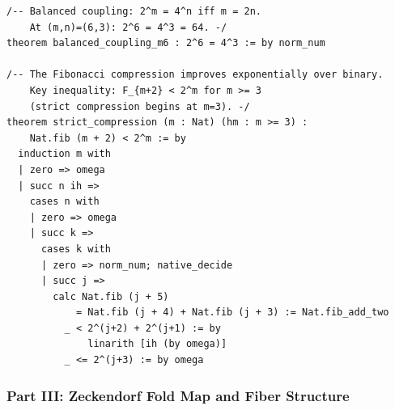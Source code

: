 \begin{lstlisting}[language=Lean4,caption={Resolution chain verification at $(m{,}n)=(6{,}3)$}]
/-- Balanced coupling: 2^m = 4^n iff m = 2n.
    At (m,n)=(6,3): 2^6 = 4^3 = 64. -/
theorem balanced_coupling_m6 : 2^6 = 4^3 := by norm_num

/-- The Fibonacci compression improves exponentially over binary.
    Key inequality: F_{m+2} < 2^m for m >= 3
    (strict compression begins at m=3). -/
theorem strict_compression (m : Nat) (hm : m >= 3) :
    Nat.fib (m + 2) < 2^m := by
  induction m with
  | zero => omega
  | succ n ih =>
    cases n with
    | zero => omega
    | succ k =>
      cases k with
      | zero => norm_num; native_decide
      | succ j =>
        calc Nat.fib (j + 5)
            = Nat.fib (j + 4) + Nat.fib (j + 3) := Nat.fib_add_two
          _ < 2^(j+2) + 2^(j+1) := by
              linarith [ih (by omega)]
          _ <= 2^(j+3) := by omega
\end{lstlisting}

\subsubsection*{Part III: Zeckendorf Fold Map and Fiber Structure}

